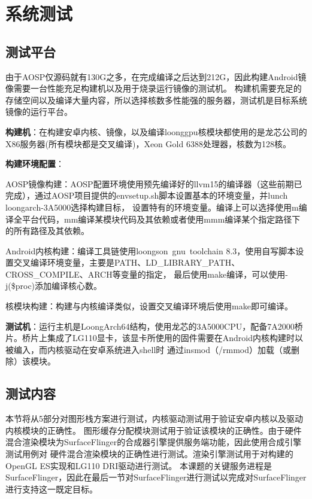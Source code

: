 
\chapter{系统测试}

\section{测试平台}
由于AOSP仅源码就有130G之多，在完成编译之后达到212G，因此构建Android镜像需要一台性能充足构建机以及用于烧录运行镜像的测试机。
构建机需要充足的存储空间以及编译大量内容，所以选择核数多性能强的服务器，测试机是目标系统镜像的运行平台。

\textbf{构建机}：在构建安卓内核、镜像，以及编译loonggpu核模块都使用的是龙芯公司的X86服务器(所有模块都是交叉编译)，Xeon Gold 6388处理器，核数为128核。

\textbf{构建环境配置}：

    AOSP镜像构建：AOSP配置环境使用预先编译好的llvm15的编译器（这些前期已完成），通过AOSP项目提供的envsetup.sh脚本设置基本的环境变量，并lunch loongarch-3A5000选择构建目标，
        设置特有的环境变量。编译上可以选择使用m编译全平台代码，mm编译某模块代码及其依赖或者使用mmm编译某个指定路径下的所有路径及其依赖。

    Android内核构建：编译工具链使用loongson\ gnu\ toolchain 8.3，使用自写脚本设置交叉编译环境变量，主要是PATH、LD\_LIBRARY\_PATH、CROSS\_COMPILE、ARCH等变量的指定，
        最后使用make编译，可以使用-j(\$proc)添加编译核心数。

    核模块构建：构建与内核编译类似，设置交叉编译环境后使用make即可编译。

\textbf{测试机}：运行主机是LoongArch64结构，使用龙芯的3A5000CPU，配备7A2000桥片。桥片上集成了LG110显卡，该显卡所使用的固件需要在Android内核构建时以被编入，而内核驱动在安卓系统进入shell时
    通过insmod（/rmmod）加载（或删除）该模块。

\section{测试内容}
本节将从5部分对图形栈方案进行测试，内核驱动测试用于验证安卓内核以及驱动内核模块的正确性。
图形缓存分配模块测试用于验证该模块的正确性。由于硬件混合渲染模块为SurfaceFlinger的合成器引擎提供服务端功能，因此使用合成引擎测试用例对
硬件混合渲染模块的正确性进行测试。渲染引擎测试用于对构建的OpenGL ES实现和LG110 DRI驱动进行测试。
本课题的关键服务进程是SurfaceFlinger，因此在最后一节对SurfaceFlinger进行测试以完成对SurfaceFlinger进行支持这一既定目标。

